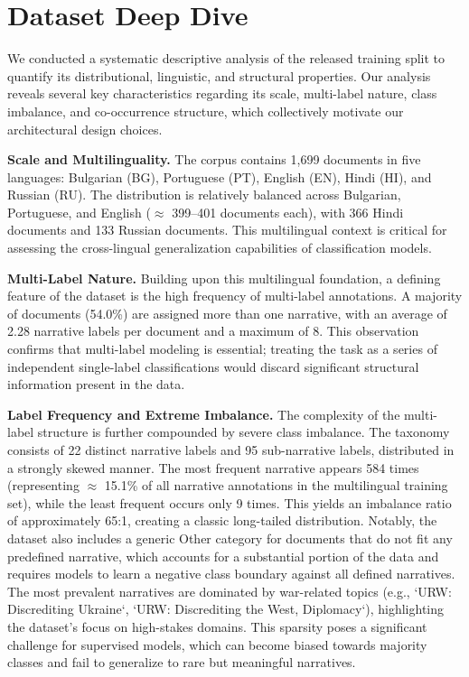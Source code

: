 \section{Dataset Deep Dive}
We conducted a systematic descriptive analysis of the released training split to quantify its distributional, linguistic, and structural properties.
Our analysis reveals several key characteristics regarding its scale, multi-label nature, class imbalance, and co-occurrence structure, which collectively motivate our architectural design choices.

\textbf{Scale and Multilinguality.} The corpus contains 1,699 documents in five languages: Bulgarian (BG), Portuguese (PT), English (EN), Hindi (HI), and Russian (RU). The distribution is relatively balanced across Bulgarian, Portuguese, and English (\(\approx\) 399--401 documents each), with 366 Hindi documents and 133 Russian documents. This multilingual context is critical for assessing the cross-lingual generalization capabilities of classification models.

\textbf{Multi-Label Nature.} Building upon this multilingual foundation, a defining feature of the dataset is the high frequency of multi-label annotations. A majority of documents (54.0\%) are assigned more than one narrative, with an average of 2.28 narrative labels per document and a maximum of 8. This observation confirms that multi-label modeling is essential; treating the task as a series of independent single-label classifications would discard significant structural information present in the data.

\textbf{Label Frequency and Extreme Imbalance.} The complexity of the multi-label structure is further compounded by severe class imbalance. The taxonomy consists of 22 distinct narrative labels and 95 sub-narrative labels, distributed in a strongly skewed manner. The most frequent narrative appears 584 times (representing \(\approx\) 15.1\% of all narrative annotations in the multilingual training set), while the least frequent occurs only 9 times. This yields an imbalance ratio of approximately 65:1, creating a classic long-tailed distribution. Notably, the dataset also includes a generic Other category for documents that do not fit any predefined narrative, which accounts for a substantial portion of the data and requires models to learn a negative class boundary against all defined narratives. The most prevalent narratives are dominated by war-related topics (e.g., `URW: Discrediting Ukraine`, `URW: Discrediting the West, Diplomacy`), highlighting the dataset's focus on high-stakes domains. This sparsity poses a significant challenge for supervised models, which can become biased towards majority classes and fail to generalize to rare but meaningful narratives.

